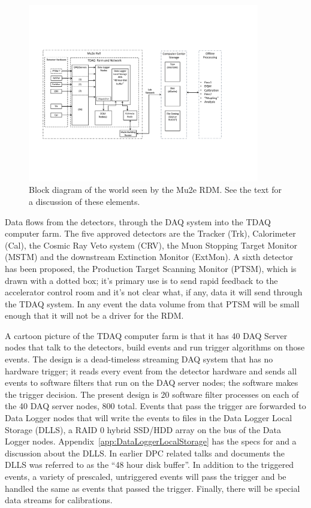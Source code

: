 \begin{figure}[tbp]
\centering
\includegraphics[width=0.9\textwidth]{figures/interface_with_TDAQ.pdf}
\caption[Block diagram of interfaces seen by the Mu2e RDM]{
  Block diagram of the world seen by the Mu2e RDM.
  See the text for a discussion of these elements.}
\label{fig:blockdiagram}
\end{figure}

Data flows from the detectors, through the DAQ system into the TDAQ computer farm.
The five approved detectors are the Tracker (Trk), Calorimeter (Cal), the Cosmic Ray Veto system (CRV),
the Muon Stopping Target Monitor (MSTM) and the downstream Extinction Monitor (ExtMon).
A sixth detector has been proposed, the Production Target Scanning Monitor (PTSM),
which is drawn with a dotted box;
it's primary use is to send rapid feedback to the accelerator control room
and it's not clear what, if any, data it will send through the TDAQ system.
In any event the data volume from that PTSM will be small enough that it will not be
a driver for the RDM.

A cartoon picture of the TDAQ computer farm is that it has 40 DAQ Server nodes
that talk to the detectors, build events and run trigger algorithms on those events.
The design is a dead-timeless streaming DAQ system that has no hardware trigger;
it reads every event from the detector hardware and sends all events to software filters
that run on the DAQ server nodes;
the software makes the trigger decision.
The present design is 20 software filter processes on each of the 40 DAQ server nodes, 800 total.
Events that pass the trigger are forwarded to Data Logger nodes that will write the events
to files in the Data Logger Local Storage (DLLS), a RAID 0 hybrid SSD/HDD array on the bus of the Data Logger nodes.
Appendix~\ref{app:DataLoggerLocalStorage} has the specs for and a discussion about the DLLS.
In earlier DPC related talks and documents the DLLS  was referred to as the ``48 hour disk buffer''.
In addition to the triggered events, a variety of prescaled, untriggered events will pass the
trigger and be handled the same as events that passed the trigger.
Finally, there will be special data streams for calibrations.

